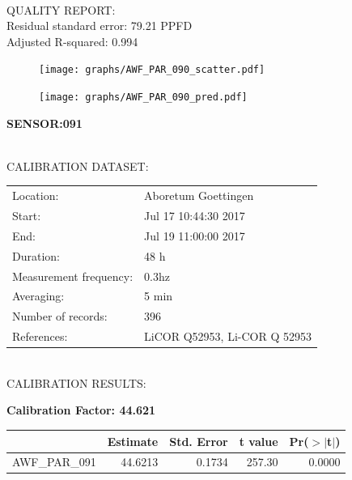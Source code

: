 \documentclass[oneside]{report}
\begin{document}
\hrulefill\\
QUALITY REPORT:\\
Residual standard error: 79.21 PPFD\\
Adjusted R-squared: 0.994



\begin{figure}[H]
  \centering
  \texttt{[image: graphs/AWF\_PAR\_090\_scatter.pdf]}
\end{figure}




\begin{figure}[H]
  \centering
  \texttt{[image: graphs/AWF\_PAR\_090\_pred.pdf]}
\end{figure}

\pagebreak


\begin{center}
\large{\textbf{SENSOR:091}}\\
\end{center}

\hrulefill\\
CALIBRATION DATASET:\\
\begin{table}[h!]
  \centering
  \label{tab:table1}
  \begin{tabular}{ll}
    Location: & Aboretum Goettingen\\ 
    
    
    Start:  & Jul 17 10:44:30 2017 \\
    End:   & Jul 19 11:00:00 2017\\ 
    Duration: & 48 h\\
    Measurement frequency: & 0.3hz\\
    Averaging:  &5 min\\
    Number of records: & 396 \\
    References: & LiCOR Q52953, Li-COR Q 52953 \\
  \end{tabular}
\end{table}

\hrulefill\\
CALIBRATION RESULTS:\\


\begin{center}
\textbf{\large{Calibration Factor: 44.621}}\\
\end{center}
\begin{table}[ht]
\centering
\begin{tabular}{rrrrr}
  \hline
 & Estimate & Std. Error & t value & Pr($>$$|$t$|$) \\ 
  \hline
AWF\_PAR\_091 & 44.6213 & 0.1734 & 257.30 & 0.0000 \\ 
   \hline
\end{tabular}
\end{table}
\end{document}
